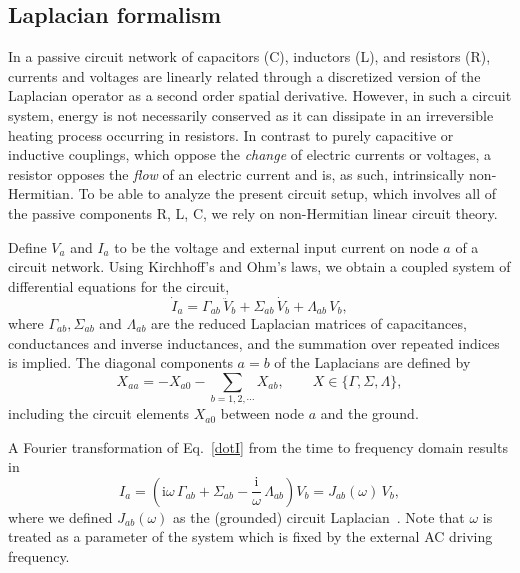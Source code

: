 \subsection{Laplacian formalism}
In a passive circuit network of capacitors (C), inductors (L), and resistors (R), currents and voltages are linearly related through a discretized version of the Laplacian operator as a second order spatial derivative. However, in such a circuit system, energy is not necessarily conserved as it can dissipate in an irreversible heating process occurring in resistors. In contrast to purely capacitive or inductive couplings, which oppose the \textit{change} of electric currents or voltages, a resistor opposes the \textit{flow} of an electric current and is, as such, intrinsically non-Hermitian. To be able to analyze the present circuit setup, which involves all of the passive components R, L, C, we rely on non-Hermitian linear circuit theory.

Define $V_a$ and $I_a$ to be the voltage and external input current on node $a$ of a circuit network. Using Kirchhoff's and Ohm's laws, we obtain a coupled system of differential equations for the circuit,
\begin{equation}
\dot{I}_a=\Gamma_{ab} \, \ddot{V}_b+\Sigma_{ab} \, \dot{V}_b+\Lambda_{ab} \, V_b,
\label{dotI}
\end{equation}
where $\Gamma_{ab},\Sigma_{ab}$ and $\Lambda_{ab}$ are the reduced Laplacian matrices of capacitances, conductances and inverse inductances, and the summation over repeated indices is implied. The diagonal components $a=b$ of the Laplacians are defined by 
\begin{equation}
X_{aa}=-X_{a0}-\sum_{b=1,2,\cdots}X_{ab},\qquad X\in\{\Gamma,\Sigma,\Lambda\},
\end{equation}
including the circuit elements $X_{a0}$ between node $a$ and the ground. 

A Fourier transformation of Eq.~\eqref{dotI} from the time to frequency domain results in
\begin{equation}
I_a=\left(\mathrm{i}\omega \, \Gamma_{ab}+\Sigma_{ab}-\frac{\mathrm{i}}{\omega} \, \Lambda_{ab}\right)V_b =J_{ab}(\omega) \, V_b ,
\label{I2}
\end{equation}
where we defined $J_{ab}(\omega)$ as the (grounded) circuit Laplacian~\cite{LeeTopolectrical18}. Note that $\omega$ is treated as a parameter of the system which is fixed by the external AC driving frequency. 

